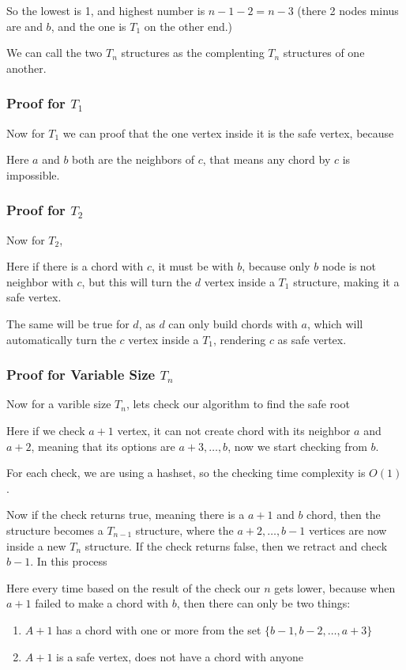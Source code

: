 \documentclass[12pt,a4paper]{article}
\begin{document}
So the lowest is 1, and highest number is $n - 1 - 2 = n - 3$ (there 2 nodes minus are and $b$, and the one is $T_1$ on the other end.)

We can call the two $T_n$ structures as the complenting $T_n$ structures of one another. 

\subsubsection{Proof for $T_1$}

Now for $T_1$ we can proof that the one vertex inside it is the safe vertex, because

Here $a$ and $b$ both are the neighbors of $c$, that means any chord by $c$ is impossible.

\subsubsection{Proof for $T_2$}

Now for $T_2$, 

Here if there is a chord with $c$, it must be with $b$, because only $b$ node is not neighbor with $c$, but this will turn the $d$ vertex inside a $T_1$ structure, making it a safe vertex.

The same will be true for $d$, as $d$ can only build chords with $a$, which will automatically turn the $c$ vertex inside a $T_1$, rendering $c$ as safe vertex.

\subsubsection{Proof for Variable Size $T_n$}

Now for a varible size $T_n$, lets check our algorithm to find the safe root

Here if we check $a+1$ vertex, it can not create chord with its neighbor $a$ and $a+2$, meaning that its options are $a+3,\ldots,b$, now we start checking from $b$.

For each check, we are using a hashset, so the checking time complexity is $O(1)$.

Now if the check returns true, meaning there is a $a+1$ and $b$ chord, then the structure becomes a $T_{n-1}$ structure, where the $a+2,\ldots,b-1$ vertices are now inside a new $T_n$ structure. If the check returns false, then we retract and check $b-1$. In this process 

Here every time based on the result of the check our $n$ gets lower, because when $a+1$ failed to make a chord with $b$, then there can only be two things:
\begin{enumerate}
    \item $A+1$ has a chord with one or more from the set $\{b-1,b-2,\ldots,a+3\}$
    \item $A+1$ is a safe vertex, does not have a chord with anyone
\end{enumerate}
\end{document}
